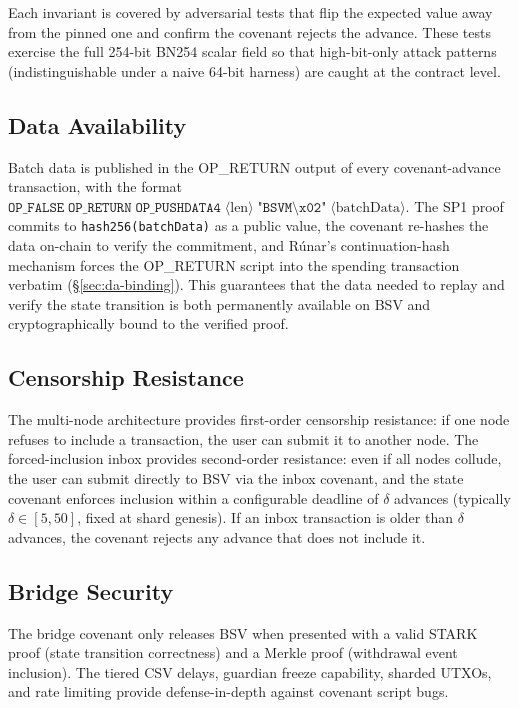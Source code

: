 \documentclass[11pt,twocolumn]{article}
\begin{document}
Each invariant is covered by adversarial tests that flip the expected value away from the pinned one and confirm the covenant rejects the advance. These tests exercise the full 254-bit BN254 scalar field so that high-bit-only attack patterns (indistinguishable under a naive 64-bit harness) are caught at the contract level.

\subsection{Data Availability}

Batch data is published in the OP\_RETURN output of every covenant-advance transaction, with the format $\texttt{OP\_FALSE}\;\texttt{OP\_RETURN}\;\texttt{OP\_PUSHDATA4}\;\langle \text{len} \rangle\;\texttt{"BSVM\textbackslash x02"}\;\langle \text{batchData} \rangle$. The SP1 proof commits to \texttt{hash256(batchData)} as a public value, the covenant re-hashes the data on-chain to verify the commitment, and R\'{u}nar's continuation-hash mechanism forces the OP\_RETURN script into the spending transaction verbatim (\S\ref{sec:da-binding}). This guarantees that the data needed to replay and verify the state transition is both permanently available on BSV and cryptographically bound to the verified proof.

\subsection{Censorship Resistance}

The multi-node architecture provides first-order censorship resistance: if one node refuses to include a transaction, the user can submit it to another node. The forced-inclusion inbox provides second-order resistance: even if all nodes collude, the user can submit directly to BSV via the inbox covenant, and the state covenant enforces inclusion within a configurable deadline of $\delta$ advances (typically $\delta \in [5, 50]$, fixed at shard genesis). If an inbox transaction is older than $\delta$ advances, the covenant rejects any advance that does not include it.

\subsection{Bridge Security}

The bridge covenant only releases BSV when presented with a valid STARK proof (state transition correctness) and a Merkle proof (withdrawal event inclusion). The tiered CSV delays, guardian freeze capability, sharded UTXOs, and rate limiting provide defense-in-depth against covenant script bugs.
\end{document}
